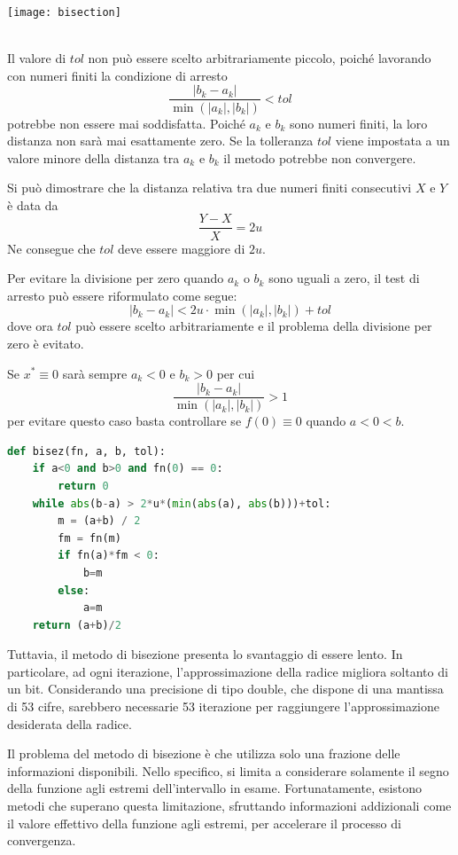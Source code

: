 \documentclass{article}
\begin{document}
\begin{center}
    \texttt{[image: bisection]}
\end{center}
\begin{oss}\leavevmode\\
    Il valore di $tol$ non può essere scelto arbitrariamente piccolo, poiché 
    lavorando con numeri finiti la condizione di arresto
    $$\frac{\left\lvert b_k-a_k\right\rvert}{\min(\left\lvert
    a_k\right\rvert, \left\lvert b_k\right\rvert)}<tol$$
    potrebbe non essere mai soddisfatta. Poiché $a_k$ e $b_k$ sono numeri
    finiti, la loro distanza non sarà mai esattamente zero. Se la tolleranza
    $tol$ viene impostata a un valore minore della distanza tra $a_k$ e $b_k$
    il metodo potrebbe non convergere. 

    Si può dimostrare che la distanza relativa tra due numeri finiti
    consecutivi $X$ e $Y$ è data da 
    $$\frac{Y-X}{X}=2u$$
    Ne consegue che $tol$ deve essere maggiore di $2u$.

    Per evitare la divisione per zero quando $a_k$ o $b_k$ sono uguali a zero,
    il test di arresto può essere riformulato come segue:
    $$\left\lvert b_k-a_k\right\rvert < 2u\cdot \min(\left\lvert
    a_k\right\rvert,\left\lvert b_k\right\rvert)+tol$$
    dove ora $tol$ può essere scelto arbitrariamente e il problema della
    divisione per zero è evitato.
\end{oss}
\begin{oss}
    Se $x^*\equiv 0$ sarà sempre $a_k<0$ e $b_k>0$ per cui 
    $$\frac{\left\lvert b_k-a_k\right\rvert}{\min(\left\lvert
    a_k\right\rvert,\left\lvert b_k\right\rvert)}>1$$
    per evitare questo caso basta controllare se $f(0)\equiv 0$ quando
    $a<0<b$.
\end{oss}
\begin{lstlisting}[language=Python]
def bisez(fn, a, b, tol):
    if a<0 and b>0 and fn(0) == 0:
        return 0
    while abs(b-a) > 2*u*(min(abs(a), abs(b)))+tol:
        m = (a+b) / 2
        fm = fn(m)
        if fn(a)*fm < 0:
            b=m
        else:
            a=m
    return (a+b)/2 
\end{lstlisting}
Tuttavia, il metodo di bisezione presenta lo svantaggio di essere lento. In
particolare, ad ogni iterazione, l'approssimazione della radice migliora
soltanto di un bit. Considerando una precisione di tipo double, che dispone di una
mantissa di 53 cifre, sarebbero necessarie 53 iterazione per raggiungere
l'approssimazione desiderata della radice. 

Il problema del metodo di bisezione è che utilizza solo una frazione delle
informazioni disponibili. Nello specifico, si limita a considerare solamente
il segno della funzione agli estremi dell'intervallo in esame. Fortunatamente,
esistono metodi che superano questa limitazione, sfruttando informazioni
addizionali come il valore effettivo della funzione agli estremi, per
accelerare il processo di convergenza.
\end{document}
